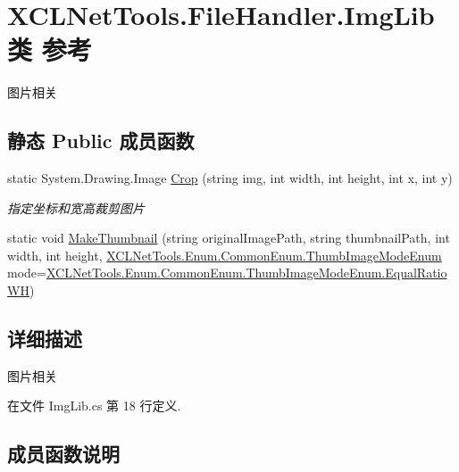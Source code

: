 \hypertarget{class_x_c_l_net_tools_1_1_file_handler_1_1_img_lib}{}\section{X\+C\+L\+Net\+Tools.\+File\+Handler.\+Img\+Lib类 参考}
\label{class_x_c_l_net_tools_1_1_file_handler_1_1_img_lib}


图片相关  


\subsection*{静态 Public 成员函数}
\begin{DoxyCompactItemize}
\item 
static System.\+Drawing.\+Image \hyperlink{class_x_c_l_net_tools_1_1_file_handler_1_1_img_lib_ad00cc641f4f1585d61ce6c86962a6213}{Crop} (string img, int width, int height, int x, int y)
\begin{DoxyCompactList}\small\item\em 指定坐标和宽高裁剪图片 \end{DoxyCompactList}\item 
static void \hyperlink{class_x_c_l_net_tools_1_1_file_handler_1_1_img_lib_ab5403c4363f26a72cc0b98a4e86d5fa1}{Make\+Thumbnail} (string original\+Image\+Path, string thumbnail\+Path, int width, int height, \hyperlink{class_x_c_l_net_tools_1_1_enum_1_1_common_enum_abb6d9d6cd508fc9ced27b814afb38974}{X\+C\+L\+Net\+Tools.\+Enum.\+Common\+Enum.\+Thumb\+Image\+Mode\+Enum} mode=\hyperlink{class_x_c_l_net_tools_1_1_enum_1_1_common_enum_abb6d9d6cd508fc9ced27b814afb38974ad2346d2aff378b001c28eaa423ca1a3a}{X\+C\+L\+Net\+Tools.\+Enum.\+Common\+Enum.\+Thumb\+Image\+Mode\+Enum.\+Equal\+Ratio\+WH})
\end{DoxyCompactItemize}


\subsection{详细描述}
图片相关 



在文件 Img\+Lib.\+cs 第 18 行定义.



\subsection{成员函数说明}
\mbox{\label{class_x_c_l_net_tools_1_1_file_handler_1_1_img_lib_ad00cc641f4f1585d61ce6c86962a6213}} 
